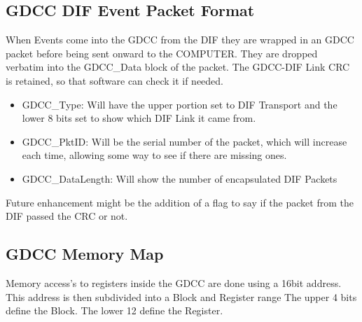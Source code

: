 \subsection{GDCC DIF Event Packet Format}

When Events come into the GDCC from the DIF they are wrapped in an GDCC packet
before being sent onward to the COMPUTER. They are dropped verbatim into the
GDCC\_Data block of the packet. The GDCC-DIF Link CRC is retained, so that
software can check it if needed.

\begin{itemize}
\item GDCC\_Type: Will have the upper portion set to DIF Transport and the lower
  8 bits set to show which DIF Link it came from.
\item GDCC\_PktID: Will be the serial number of the packet, which will increase
  each time, allowing some way to see if there are missing ones.
\item GDCC\_DataLength: Will show the number of encapsulated DIF Packets
\end{itemize} Future enhancement might be the addition of a flag to say if the
packet from the DIF passed the CRC or not.

\subsection{GDCC Memory Map}
Memory access's to registers inside the GDCC are done using a 16bit
address. This address is then subdivided into a Block and Register range The
upper 4 bits define the Block. The lower 12 define the Register.

